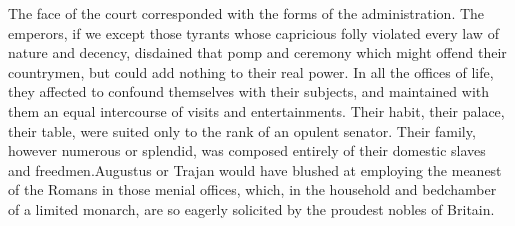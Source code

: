 
The face of the court corresponded with the forms of the
administration. The emperors, if we except those tyrants whose
capricious folly violated every law of nature and decency,
disdained that pomp and ceremony which might offend their
countrymen, but could add nothing to their real power. In all the
offices of life, they affected to confound themselves with their
subjects, and maintained with them an equal intercourse of visits
and entertainments. Their habit, their palace, their table, were
suited only to the rank of an opulent senator. Their family,
however numerous or splendid, was composed entirely of their
domestic slaves and freedmen.\footnotemark[20] Augustus or Trajan would have
blushed at employing the meanest of the Romans in those menial
offices, which, in the household and bedchamber of a limited
monarch, are so eagerly solicited by the proudest nobles of
Britain.


